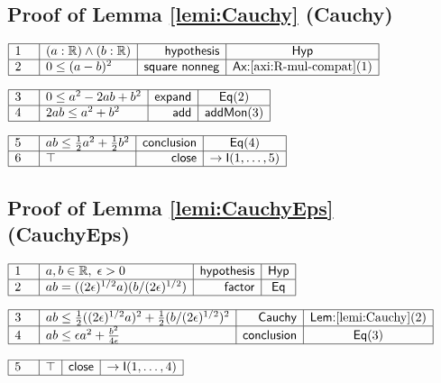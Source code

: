 \documentclass[11pt,reqno]{amsart}
\providecommand{\R}{\mathbb{R}}
\begin{document}
	\subsection*{Proof of Lemma \protect\ref{lemi:Cauchy} (\textsf{Cauchy})}
	\noindent$\begin{array}{|m{0.5cm}|l|r|c|}
	\hline
	1 & (a:\R)\wedge(b:\R) & \mathsf{hypothesis} & \mathsf{Hyp} \\ \hline
	2 & 0\le(a-b)^{2} & \mathsf{square\ nonneg} & \textsf{Ax:}\ref{axi:R-mul-compat}(1) \\ \hline
	\end{array}$
	\par\nointerlineskip\noindent$\begin{array}{|m{0.5cm}|l|r|c|}
	\hline
	3 & 0\le a^{2}-2ab+b^{2} & \mathsf{expand} & \mathsf{Eq}(2) \\ \hline
	4 & 2ab\le a^{2}+b^{2} & \mathsf{add} & \mathsf{addMon}(3) \\ \hline
	\end{array}$
	\par\nointerlineskip\noindent$\begin{array}{|m{0.5cm}|l|r|c|}
	\hline
	5 & ab\le\tfrac12 a^{2}+\tfrac12 b^{2} & \mathsf{conclusion} & \mathsf{Eq}(4) \\ \hline
	6 & \top & \mathsf{close} & \to\mathsf{I}(1,\dots,5) \\ \hline
	\end{array}$
	\medskip
	
	\subsection*{Proof of Lemma \protect\ref{lemi:CauchyEps} (\textsf{CauchyEps})}
	\noindent$\begin{array}{|m{0.5cm}|l|r|c|}
	\hline
	1 & a,b\in\R,\;\epsilon>0 & \mathsf{hypothesis} & \mathsf{Hyp} \\ \hline
	2 & ab=((2\epsilon)^{1/2}a)(b/(2\epsilon)^{1/2}) & \mathsf{factor} & \mathsf{Eq} \\ \hline
	\end{array}$
	\par\nointerlineskip\noindent$\begin{array}{|m{0.5cm}|l|r|c|}
	\hline
	3 & ab\le\tfrac12((2\epsilon)^{1/2}a)^{2}+\tfrac12(b/(2\epsilon)^{1/2})^{2} & \mathsf{Cauchy} & \textsf{Lem:}\ref{lemi:Cauchy}(2) \\ \hline
	4 & ab\le\epsilon a^{2}+\tfrac{b^{2}}{4\epsilon} & \mathsf{conclusion} & \mathsf{Eq}(3) \\ \hline
	\end{array}$
	\par\nointerlineskip\noindent$\begin{array}{|m{0.5cm}|l|r|c|}
	\hline
	5 & \top & \mathsf{close} & \to\mathsf{I}(1,\dots,4) \\ \hline
	\end{array}$
	\medskip
	
\end{document}
